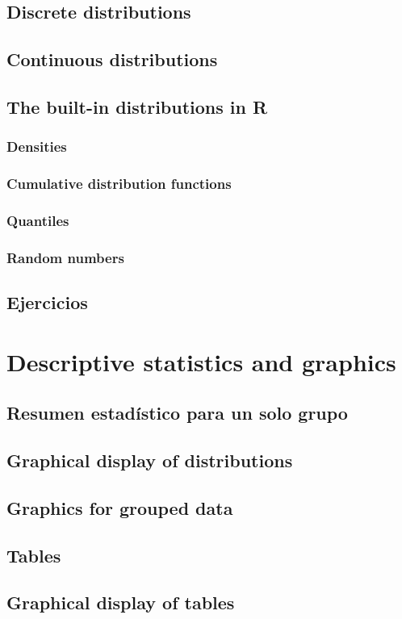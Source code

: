 \documentclass[spanish]{extbook}
\numberwithin{equation}{section}
\numberwithin{figure}{section}
\begin{document}
\section{Discrete distributions}
\section{Continuous distributions}
\section{The built-in distributions in R}
\subsection{Densities}
\subsection{Cumulative distribution functions}
\subsection{Quantiles}
\subsection{Random numbers}
\section{Ejercicios}

\chapter{Descriptive statistics and graphics}
\section{Resumen estadístico para un solo grupo} \label{resestad}
\section{Graphical display of distributions}
\section{Graphics for grouped data}
\section{Tables} \label{tables}
\section{Graphical display of tables}
\end{document}
